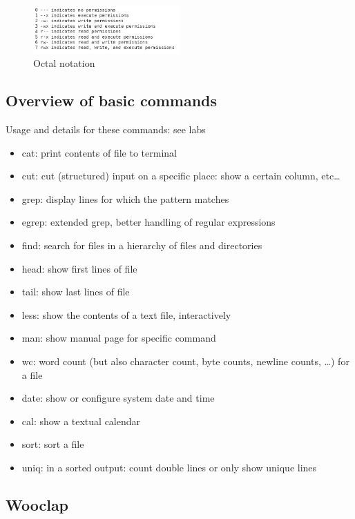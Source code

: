 \documentclass{article}
\begin{document}
\begin{figure}[H]
    \centering
    \includegraphics[width=0.5\textwidth]{octal-notation.png}
    \caption{Octal notation}
\end{figure}


\subsection{Overview of basic commands}

Usage and details for these commands: see labs

\begin{itemize}
    \item cat: print contents of file to terminal
    \item cut: cut (structured) input on a specific place: show a certain column, etc\dots
    \item grep: display lines for which the pattern matches
    \item egrep: extended grep, better handling of regular expressions
    \item find: search for files in a hierarchy of files and directories
    \item head: show first lines of file
    \item tail: show last lines of file
    \item less: show the contents of a text file, interactively
    \item man: show manual page for specific command
    \item wc: word count (but also character count, byte counts, newline counts, \dots) for a file
    \item date: show or configure system date and time
    \item cal: show a textual calendar
    \item sort: sort a file
    \item uniq: in a sorted output: count double lines or only show unique lines
\end{itemize}

\subsection{Wooclap}
\end{document}
